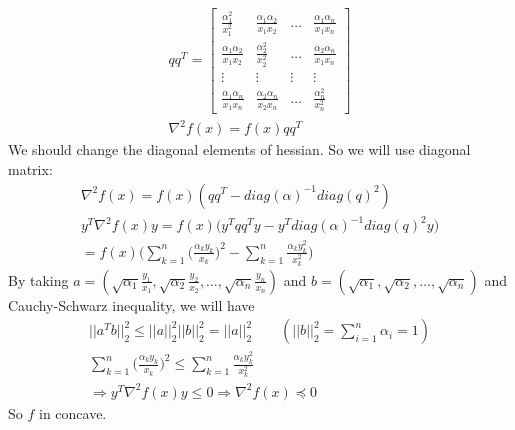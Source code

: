 \begin{latin}
\begin{gather*}
	qq^{T} = \begin{bmatrix}
		\frac{\alpha_1^{2}}{x_{1}^{2}} & \frac{\alpha_1 \alpha_2}{x_{1} x_{2}} & \dots & \frac{\alpha_1 \alpha_n}{x_{1} x_{n}}
		\\
		\frac{\alpha_1 \alpha_2}{x_{1} x_{2}} & \frac{\alpha_2^{2}}{x_{2}^{2}} & \dots & \frac{\alpha_2 \alpha_n}{x_{1} x_{n}}
		\\
		\vdots & \vdots & \vdots & \vdots
		\\
		\frac{\alpha_1 \alpha_n}{x_{1} x_{n}} & \frac{\alpha_2 \alpha_n}{x_{2} x_{n}} & \dots & \frac{\alpha_n^{2}}{x_{n}^{2}}
	\end{bmatrix}
	\\
	\nabla^{2} f(x) =  f(x) qq^{T}
\end{gather*}
We should change the diagonal elements of hessian. So we will use diagonal matrix:
\begin{gather*}
	\nabla^{2} f(x) =  f(x) (qq^{T} - diag(\alpha)^{-1} diag(q)^{2}) 
	\\
	y^{T} \nabla^{2} f(x) y = f(x) \bigg( y^{T}qq^{T}y - y^{T} diag(\alpha)^{-1} diag(q)^{2}y  \bigg)
	\\
	 = f(x) \bigg( \sum_{k=1}^{n} \big(\frac{\alpha_k y_k}{x_k}\big)^{2} - \sum_{k=1}^{n} \frac{\alpha_k y_k^{2}}{x_k^{2}} \bigg)
\end{gather*}
By taking $ a = (\sqrt{\alpha_1}\frac{y_{1}}{x_{1}}, \sqrt{\alpha_2}\frac{y_{2}}{x_{2}}, \dots, \sqrt{\alpha_n}\frac{y_{n}}{x_{n}}) $ and $ b = (\sqrt{\alpha_1},\sqrt{\alpha_2},\dots,\sqrt{\alpha_n}) $ and Cauchy-Schwarz inequality, we will have
\begin{gather*}
	||a^{T}b||_{2}^{2} \leq ||a||_{2}^{2} ||b||_{2}^{2} = ||a||_{2}^{2} \qquad (||b||_{2}^{2} = \sum_{i=1}^{n} \alpha_i = 1)
	\\
	\sum_{k=1}^{n} \big(\frac{\alpha_k y_k}{x_k}\big)^{2} \leq \sum_{k=1}^{n} \frac{\alpha_k y_k^{2}}{x_k^{2}}
	\\
	\Rightarrow y^{T} \nabla^{2} f(x) y \leq 0 \Rightarrow \nabla^{2} f(x) \preceq 0
\end{gather*}
So $ f $ in concave. 
\end{latin}